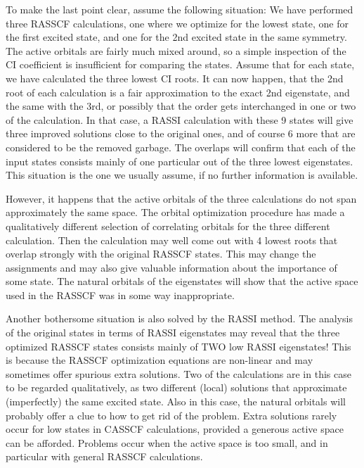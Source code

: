 To make the last point clear, assume the following situation:
We have
performed three RASSCF calculations, one where we optimize for the
lowest state, one for the first excited state, and one for the 2nd
excited state in the same symmetry. The active orbitals are fairly
much mixed around, so a simple inspection of the CI coefficient is
insufficient for comparing the states. Assume that for each state, we
have calculated the three lowest CI roots. It can now happen, that the
2nd root of each calculation is a fair approximation to the exact 2nd
eigenstate, and the same with the 3rd, or possibly that the order gets
interchanged in one or two of the calculation. In that case, a RASSI
calculation with these 9 states will give three improved solutions
close to the original ones, and of course 6 more that are considered
to be the removed garbage. The overlaps will confirm that each of the
input states consists mainly of one particular out of the three lowest
eigenstates. This situation is the one we usually assume, if no
further information is available.

However, it happens that the active orbitals of the three calculations
do not span approximately the same space. The orbital optimization
procedure has made a qualitatively different selection of correlating
orbitals for the three different calculation. Then the 
calculation may well come out with 4 lowest roots that overlap
strongly with the original RASSCF states. This may change the
assignments and may also give valuable information about the
importance of some state. The natural orbitals of the eigenstates will
show that the active space used in the RASSCF was in some way
inappropriate.

Another bothersome situation is also solved by the RASSI method. The
analysis of the original states in terms of RASSI eigenstates may
reveal that the three optimized RASSCF states consists mainly of TWO
low RASSI eigenstates! This is because the RASSCF optimization
equations are non-linear and may sometimes offer spurious extra
solutions. Two of the calculations are in this case to be regarded
qualitatively, as two different (local) solutions that
approximate (imperfectly) the same excited state. Also in this case, the
natural orbitals will probably offer a clue to how to get rid of the
problem. Extra solutions rarely occur for low states in CASSCF
calculations, provided a generous active space can be afforded.
Problems occur when the active space is too small, and in
particular with general RASSCF calculations.

